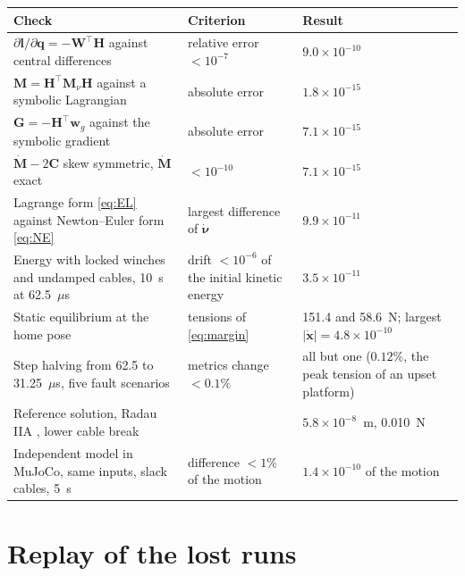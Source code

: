 \documentclass{interact}
\newcommand{\vc}[1]{\bm{#1}}
\newcommand{\mt}[1]{\mathbf{#1}}
\begin{document}
\begin{table}
{\begin{tabular}{@{}p{}p{}p{}@{}}
\toprule
Check & Criterion & Result\\
\midrule
$\partial\vc l/\partial\vc q=-\mt W^\top\mt H$ against central differences & relative error $<10^{-7}$ & $9.0\times10^{-10}$\\
$\mt M=\mt H^\top\mt M_\nu\mt H$ against a symbolic Lagrangian & absolute error & $1.8\times10^{-15}$\\
$\vc G=-\mt H^\top\vc w_g$ against the symbolic gradient & absolute error & $7.1\times10^{-15}$\\
$\dot{\mt M}-2\mt C$ skew symmetric, $\dot{\mt M}$ exact & $<10^{-10}$ & $7.1\times10^{-15}$\\
Lagrange form \eqref{eq:EL} against Newton--Euler form \eqref{eq:NE} & largest difference of $\dot{\vc\nu}$ & $9.9\times10^{-11}$\\
Energy with locked winches and undamped cables, 10~s at 62.5~$\mu$s & drift $<10^{-6}$ of the initial kinetic energy & $3.5\times10^{-11}$\\
Static equilibrium at the home pose & tensions of \eqref{eq:margin} & 151.4 and 58.6~N; largest $|\dot{\vc x}|=4.8\times10^{-10}$\\
Step halving from 62.5 to 31.25~$\mu$s, five fault scenarios & metrics change $<0.1\%$ & all but one ($0.12\%$, the peak tension of an upset platform)\\
Reference solution, Radau IIA \citep{virtanen2020scipy}, lower cable break & & $5.8\times10^{-8}$~m, 0.010~N\\
Independent model in MuJoCo, same inputs, slack cables, 5~s & difference $<1\%$ of the motion & $1.4\times10^{-10}$ of the motion\\
\bottomrule
\end{tabular}}
\label{tab:verification}
\end{table}

\section{Replay of the lost runs}\label{sec:replay}
\end{document}
